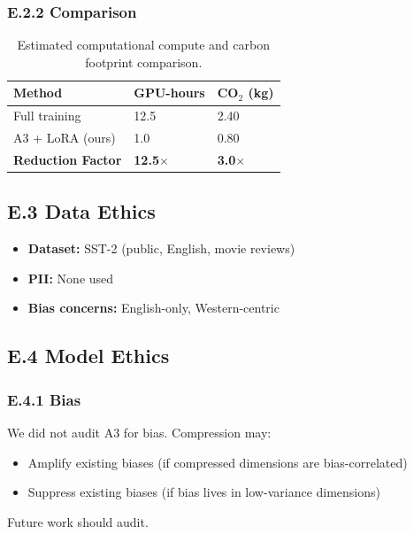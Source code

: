 \subsubsection{E.2.2 Comparison}

\begin{table}[H]
\centering
\small
\begin{tabular}{lll}
\toprule
\textbf{Method} & \textbf{GPU-hours} & \textbf{CO$_2$ (kg)} \\
\midrule
Full training & 12.5 & 2.40 \\
A3 + LoRA (ours) & 1.0 & 0.80 \\
\textbf{Reduction Factor} & \textbf{12.5$\times$} & \textbf{3.0$\times$} \\
\bottomrule
\end{tabular}
\caption{Estimated computational compute and carbon footprint comparison.}
\label{tab:app\_co2\_comparison}
\end{table}

\subsection{E.3 Data Ethics}

\begin{itemize}
\item \textbf{Dataset:} SST-2 (public, English, movie reviews)
\item \textbf{PII:} None used
\item \textbf{Bias concerns:} English-only, Western-centric

\end{itemize}
\subsection{E.4 Model Ethics}

\subsubsection{E.4.1 Bias}

We did not audit A3 for bias. Compression may:

\begin{itemize}
\item Amplify existing biases (if compressed dimensions are bias-correlated)
\item Suppress existing biases (if bias lives in low-variance dimensions)

\end{itemize}
Future work should audit.

